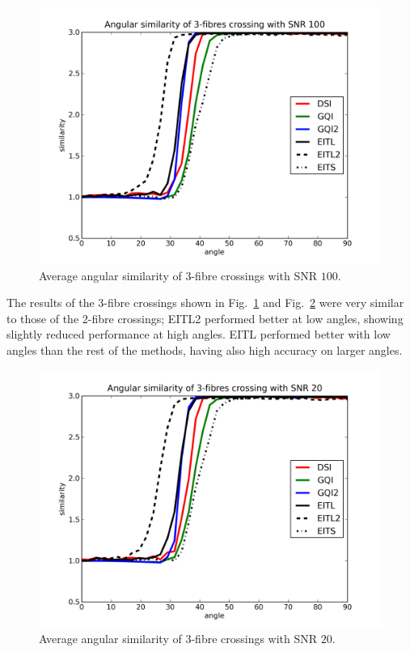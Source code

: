 \documentclass{bioinfo}
\begin{document}
%
\begin{figure}
\begin{centering}
\includegraphics[scale=0.5]{figures/3_100}
\par\end{centering}

\caption{Average angular similarity of $3$-fibre crossings with SNR $100$.}


\label{Flo:3_100}
\end{figure}


The results of the 3-fibre crossings shown in Fig.~\ref{Flo:3_100}
and Fig.~\ref{Flo:3_20} were very similar to those of the 2-fibre
crossings; EITL2 performed better at low angles, showing slightly
reduced performance at high angles. EITL performed better with low
angles than the rest of the methods, having also high accuracy on
larger angles.

%
\begin{figure}
\begin{centering}
\includegraphics[scale=0.5]{figures/3_20}
\par\end{centering}

\caption{Average angular similarity of $3$-fibre crossings with SNR $20$.}


\label{Flo:3_20}
\end{figure}
\end{document}
